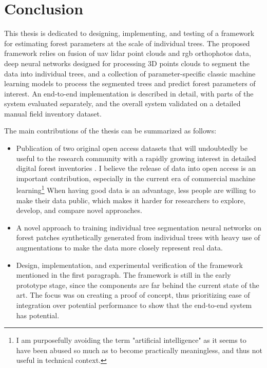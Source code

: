 \chapter{Conclusion}\label{cap:conclusion}


This thesis is dedicated to designing, implementing, and testing of a framework for estimating forest parameters at the scale of individual trees.
The proposed framework relies on fusion of \gls{uav} \gls{lidar} point clouds and \gls{rgb} orthophotos data, deep neural networks designed for processing 3D points clouds to segment the data into individual trees, and a collection of parameter-specific classic machine learning models to process the segmented trees and predict forest parameters of interest.
An end-to-end implementation is described in detail, with parts of the system evaluated separately, and the overall system validated on a detailed manual field inventory dataset.

The main contributions of the thesis can be summarized as follows:

\begin{itemize}
\item Publication of two original open access datasets that will undoubtedly be useful to the research community with a rapidly growing interest in detailed digital forest inventories \citep{dubrovinExplorationPropertiesPoint2024, dubrovinOpenDatasetIndividual2024}.
I believe the release of data into open access is an important contribution, especially in the current era of commercial machine learning\footnote{I am purposefully avoiding the term "artificial intelligence" as it seems to have been abused so much as to become practically meaningless, and thus not useful in technical context.}
When having good data is an advantage, less people are willing to make their data public, which makes it harder for researchers to explore, develop, and compare novel approaches.
\item A novel approach to training individual tree segmentation neural networks on forest patches synthetically generated from individual trees with heavy use of augmentations to make the data more closely represent real data.
\item Design, implementation, and experimental verification of the framework mentioned in the first paragraph.
The framework is still in the early prototype stage, since the components are far behind the current state of the art.
The focus was on creating a proof of concept, thus prioritizing ease of integration over potential performance to show that the end-to-end system has potential.
\end{itemize}


